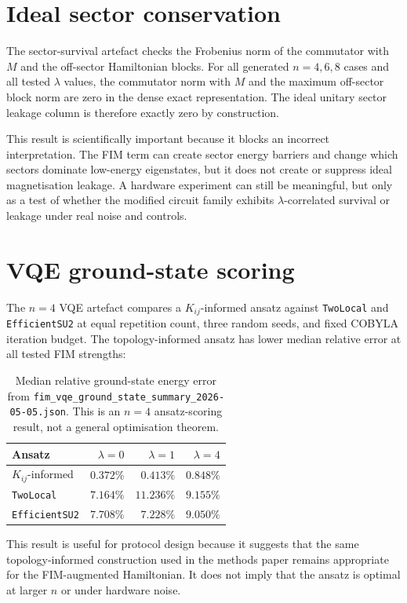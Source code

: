 \documentclass[preprint,aps,physrev,superscriptaddress,floatfix,longbibliography]{revtex4-2}
\begin{document}
\section{Ideal sector conservation}

The sector-survival artefact checks the Frobenius norm of the commutator with
$M$ and the off-sector Hamiltonian blocks. For all generated $n=4,6,8$ cases
and all tested $\lambda$ values, the commutator norm with $M$ and the maximum
off-sector block norm are zero in the dense exact representation. The ideal
unitary sector leakage column is therefore exactly zero by construction.

This result is scientifically important because it blocks an incorrect
interpretation. The FIM term can create sector energy barriers and change which
sectors dominate low-energy eigenstates, but it does not create or suppress
ideal magnetisation leakage. A hardware experiment can still be meaningful, but
only as a test of whether the modified circuit family exhibits
$\lambda$-correlated survival or leakage under real noise and controls.

\section{VQE ground-state scoring}

The $n=4$ VQE artefact compares a $K_{ij}$-informed ansatz against
\texttt{TwoLocal} and \texttt{EfficientSU2} at equal repetition count,
three random seeds, and fixed COBYLA iteration budget. The topology-informed
ansatz has lower median relative error at all tested FIM strengths:
%
\begin{table}[tb]
\centering
\small
\begin{tabular}{lrrr}
\toprule
Ansatz & $\lambda=0$ & $\lambda=1$ & $\lambda=4$ \\
\midrule
$K_{ij}$-informed & $0.372\%$ & $0.413\%$ & $0.848\%$ \\
\texttt{TwoLocal} & $7.164\%$ & $11.236\%$ & $9.155\%$ \\
\texttt{EfficientSU2} & $7.708\%$ & $7.228\%$ & $9.050\%$ \\
\bottomrule
\end{tabular}
\caption{Median relative ground-state energy error from
\texttt{fim\_vqe\_ground\_state\_summary\_2026-05-05.json}. This is an
$n=4$ ansatz-scoring result, not a general optimisation theorem.}
\label{tab:vqe}
\end{table}

This result is useful for protocol design because it suggests that the same
topology-informed construction used in the methods paper remains appropriate
for the FIM-augmented Hamiltonian. It does not imply that the ansatz is optimal
at larger $n$ or under hardware noise.
\end{document}
